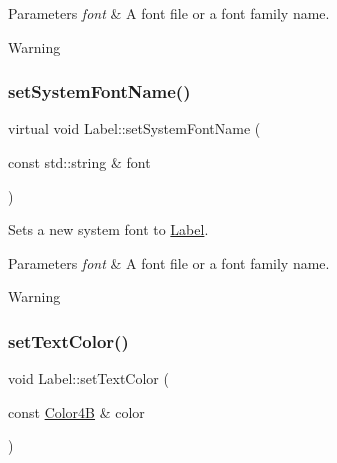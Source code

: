 \begin{DoxyParams}{Parameters}
{\em font} & A font file or a font family name. \\
\hline
\end{DoxyParams}
\begin{DoxyWarning}{Warning}

\end{DoxyWarning}
\mbox{\label{classLabel_a7e89d708a8ddcb5b5ad6e565c2721354}} 
\subsubsection{\texorpdfstring{set\+System\+Font\+Name()}{setSystemFontName()}\hspace{0.1cm}{\footnotesize\ttfamily [2/2]}}
{\footnotesize\ttfamily virtual void Label\+::set\+System\+Font\+Name (\begin{DoxyParamCaption}\item[{const std\+::string \&}]{font }\end{DoxyParamCaption})\hspace{0.3cm}{\ttfamily [virtual]}}

Sets a new system font to \hyperlink{classLabel}{Label}.


\begin{DoxyParams}{Parameters}
{\em font} & A font file or a font family name. \\
\hline
\end{DoxyParams}
\begin{DoxyWarning}{Warning}

\end{DoxyWarning}
\mbox{\label{classLabel_a692d2efd4b152b36df5cfcfbd9ee856d}} 
\subsubsection{\texorpdfstring{set\+Text\+Color()}{setTextColor()}\hspace{0.1cm}{\footnotesize\ttfamily [1/2]}}
{\footnotesize\ttfamily void Label\+::set\+Text\+Color (\begin{DoxyParamCaption}\item[{const \hyperlink{structColor4B}{Color4B} \&}]{color }\end{DoxyParamCaption})\hspace{0.3cm}{\ttfamily [virtual]}}


